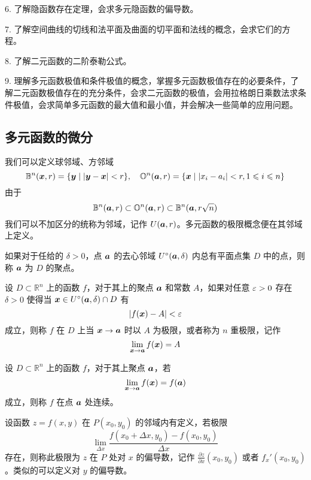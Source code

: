6. 了解隐函数存在定理，会求多元隐函数的偏导数。

7. 了解空间曲线的切线和法平面及曲面的切平面和法线的概念，会求它们的方程。

8. 了解二元函数的二阶泰勒公式。

9. 理解多元函数极值和条件极值的概念，掌握多元函数极值存在的必要条件，了解二元函数极值存在的充分条件，会求二元函数的极值，会用拉格朗日乘数法求条件极值，会求简单多元函数的最大值和最小值，并会解决一些简单的应用问题。

\subsection{多元函数的微分}

我们可以定义球邻域、方邻域
\[ \mathbb{B}^n(\boldsymbol{x}, r) = \{ \boldsymbol{y} \mid |\boldsymbol{y}-\boldsymbol{x}| < r \}, \quad \mathbb{O}^n(\boldsymbol{a}, r) = \{ \boldsymbol{x} \mid |x_i - a_i| < r, 1 \leqslant i \leqslant n \} \]
由于
\[ \mathbb{B}^n(\boldsymbol{a}, r) \subset \mathbb{O}^n(\boldsymbol{a}, r) \subset \mathbb{B}^n(\boldsymbol{a}, r\sqrt{n})  \]
我们可以不加区分的统称为邻域，记作 $U(\boldsymbol{a}, r)$。多元函数的极限概念便在其邻域上定义。

如果对于任给的 $\delta > 0$，点 $\boldsymbol{a}$ 的去心邻域 $U^\circ(\boldsymbol{a}, \delta)$ 内总有平面点集 $D$ 中的点，则称 $\boldsymbol{a}$ 为 $D$ 的聚点。

\begin{definition}[多元函数的极限]
	设 $D \subset \mathbb{R}^n$ 上的函数 $f$，对于其上的聚点 $\boldsymbol{a}$ 和常数 $A$，如果对任意 $\varepsilon > 0$ 存在 $\delta > 0$ 使得当 $\boldsymbol{x} \in U^{\circ}(\boldsymbol{a}, \delta) \cap D$ 有
	\[ |f(\boldsymbol{x}) - A| < \varepsilon \]
	成立，则称 $f$ 在 $D$ 上当 $\boldsymbol{x} \to \boldsymbol{a}$ 时以 $A$ 为极限，或者称为 $n$ 重极限，记作
	\[ \lim_{\boldsymbol{x} \to \boldsymbol{a}} f(\boldsymbol{x}) = A \]
\end{definition}

\begin{definition}[多元函数的连续性]
	设 $D \subset \mathbb{R}^n$ 上的函数 $f$，对于其上聚点 $\boldsymbol{a}$，若
	\[ \lim_{\boldsymbol{x} \to \boldsymbol{a}} f(\boldsymbol{x}) = f(\boldsymbol{a}) \]
	成立，则称 $f$ 在点 $\boldsymbol{a}$ 处连续。
\end{definition}

\begin{definition}[二元函数的偏导数]
	设函数 $z = f(x, y)$ 在 $P(x_0, y_0)$ 的邻域内有定义，若极限
	\[ \lim_{\Delta x} \frac{f(x_0 + \Delta x, y_0) - f(x_0, y_0)}{\Delta x} \]
	存在，则称此极限为 $z$ 在 $P$ 处对 $x$ 的偏导数，记作 $\frac{\partial z}{\partial x}(x_0, y_0)$ 或者 $f_x'(x_0, y_0)$。类似的可以定义对 $y$ 的偏导数。
\end{definition}

